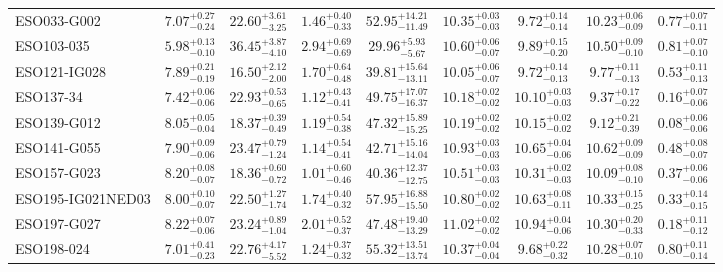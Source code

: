 \documentclass[onecolumn]{mn2e}
\begin{document}
{\begin{center}
\begin{longtable}{lcccccccc}
ESO033-G002 & $7.07_{-0.24}^{+0.27}$ & $22.60_{-3.25}^{+3.61}$ & $1.46_{-0.33}^{+0.40}$ &$52.95_{-11.49}^{+14.21}$ & $10.35_{-0.03}^{+0.03}$ & $9.72_{-0.14}^{+0.14}$ & $10.23_{-0.09}^{+0.06}$ & $0.77_{-0.11}^{+0.07}$ \\
ESO103-035 & $5.98_{-0.10}^{+0.13}$ & $36.45_{-4.10}^{+3.87}$ & $2.94_{-0.69}^{+0.69}$ &$29.96_{-5.67}^{+5.93}$ & $10.60_{-0.07}^{+0.06}$ & $9.89_{-0.20}^{+0.15}$ & $10.50_{-0.10}^{+0.09}$ & $0.81_{-0.10}^{+0.07}$ \\
ESO121-IG028 & $7.89_{-0.19}^{+0.21}$ & $16.50_{-2.00}^{+2.12}$ & $1.70_{-0.48}^{+0.64}$ &$39.81_{-13.11}^{+15.64}$ & $10.05_{-0.07}^{+0.06}$ & $9.72_{-0.13}^{+0.14}$ & $9.77_{-0.13}^{+0.11}$ & $0.53_{-0.13}^{+0.11}$ \\
ESO137-34 & $7.42_{-0.06}^{+0.06}$ & $22.93_{-0.65}^{+0.53}$ & $1.12_{-0.41}^{+0.43}$ &$49.75_{-16.37}^{+17.07}$ & $10.18_{-0.02}^{+0.02}$ & $10.10_{-0.03}^{+0.03}$ & $9.37_{-0.22}^{+0.17}$ & $0.16_{-0.06}^{+0.07}$ \\
ESO139-G012 & $8.05_{-0.04}^{+0.05}$ & $18.37_{-0.49}^{+0.39}$ & $1.19_{-0.38}^{+0.54}$ &$47.32_{-15.25}^{+15.89}$ & $10.19_{-0.02}^{+0.02}$ & $10.15_{-0.02}^{+0.02}$ & $9.12_{-0.39}^{+0.21}$ & $0.08_{-0.06}^{+0.06}$ \\
ESO141-G055 & $7.90_{-0.06}^{+0.09}$ & $23.47_{-1.24}^{+0.79}$ & $1.14_{-0.41}^{+0.54}$ &$42.71_{-14.04}^{+15.16}$ & $10.93_{-0.03}^{+0.03}$ & $10.65_{-0.06}^{+0.04}$ & $10.62_{-0.09}^{+0.09}$ & $0.48_{-0.07}^{+0.08}$ \\
ESO157-G023 & $8.20_{-0.07}^{+0.08}$ & $18.36_{-0.72}^{+0.60}$ & $1.01_{-0.46}^{+0.60}$ &$40.36_{-12.75}^{+12.37}$ & $10.51_{-0.03}^{+0.03}$ & $10.31_{-0.03}^{+0.02}$ & $10.09_{-0.10}^{+0.08}$ & $0.37_{-0.06}^{+0.06}$ \\
ESO195-IG021NED03 & $8.00_{-0.07}^{+0.10}$ & $22.50_{-1.74}^{+1.27}$ & $1.74_{-0.32}^{+0.40}$ &$57.95_{-15.50}^{+16.88}$ & $10.80_{-0.02}^{+0.02}$ & $10.63_{-0.11}^{+0.08}$ & $10.33_{-0.25}^{+0.15}$ & $0.33_{-0.15}^{+0.14}$ \\
ESO197-G027 & $8.22_{-0.06}^{+0.07}$ & $23.24_{-1.04}^{+0.89}$ & $2.01_{-0.37}^{+0.52}$ &$47.48_{-13.29}^{+19.40}$ & $11.02_{-0.02}^{+0.02}$ & $10.94_{-0.06}^{+0.04}$ & $10.30_{-0.33}^{+0.20}$ & $0.18_{-0.12}^{+0.11}$ \\
ESO198-024 & $7.01_{-0.23}^{+0.41}$ & $22.76_{-5.52}^{+4.17}$ & $1.24_{-0.32}^{+0.37}$ &$55.32_{-13.74}^{+13.51}$ & $10.37_{-0.04}^{+0.04}$ & $9.68_{-0.32}^{+0.22}$ & $10.28_{-0.10}^{+0.07}$ & $0.80_{-0.14}^{+0.11}$ \\

\end{longtable}
\end{center}}
\end{document}
